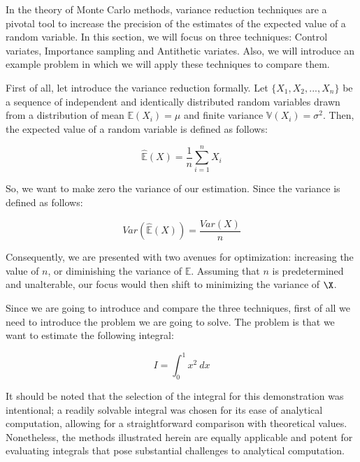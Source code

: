 \documentclass{article}
\begin{document}
In the theory of Monte Carlo methods, variance reduction techniques are a pivotal tool to increase the precision of the estimates of the expected value of a random variable. In this section, we will focus on three techniques: Control variates, Importance sampling and Antithetic variates. Also, we will introduce an example problem in which we will apply these techniques to compare them.

First of all, let introduce the variance reduction formally. Let \(\{X_1, X_2, ..., X_n\}\) be a sequence of independent and identically distributed random variables drawn from a distribution of mean \(\mathbb{E}(X_i) = \mu\) and finite variance \(\mathbb{V}(X_i) = \sigma^2\). Then, the expected value of a random variable is defined as follows:

\begin{equation} 
	\label{eq:expectedvalueestimate} 
	\hat{\mathbb{E}}(X) = \frac{1}{n} \sum_{i=1}^{n} X_i
\end{equation}

So, we want to make zero the variance of our estimation. Since the variance is defined as follows:

\begin{equation} 
	\label{eq:variance} 
	Var(\hat{\mathbb{E}}(X)) = \frac{Var(X)}{n}
\end{equation}

Consequently, we are presented with two avenues for optimization: increasing the value of \(n\), or diminishing the variance of \(\mathbb{E}\). Assuming that \(n\) is predetermined and unalterable, our focus would then shift to minimizing the variance of \(\X\).

Since we are going to introduce and compare the three techniques, first of all we need to introduce the problem we are going to solve. The problem is that we want to estimate the following integral:

\begin{equation} \label{eq:integralvariancereduction} I = \int_{0}^{1} x^2 \ dx \end{equation}

It should be noted that the selection of the integral for this demonstration was intentional; a readily solvable integral was chosen for its ease of analytical computation, allowing for a straightforward comparison with theoretical values. Nonetheless, the methods illustrated herein are equally applicable and potent for evaluating integrals that pose substantial challenges to analytical computation.
\end{document}
